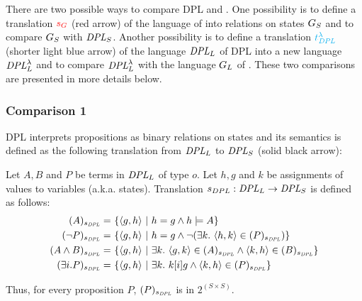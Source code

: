 There are two possible ways to compare DPL and {\GN}. One possibility is to define a translation $\textcolor{red}{s_{G}}$ (red arrow) of the language of {\GN} into relations on states $G_S$ and to compare  $G_S$ with $\textit{DPL}_{S}$. Another possibility is to define a translation $\textcolor{cyan}{t^{\lambda}_\textit{DPL}}$ (shorter light blue arrow) of the language $\textit{DPL}_L$ of DPL into a new language $\textit{DPL}^\lambda_L$ and to compare $\textit{DPL}^\lambda_L$ with the language  $G_L$ of {\GN}. These two comparisons are presented in more details below.


\subsubsection{Comparison 1}

DPL interprets propositions as binary relations on states and its semantics is defined as the following translation from $\textit{DPL}_L$ to $\textit{DPL}_{S}$ (solid black arrow):
\begin{definition} Let $A, B$ and $P$ be terms in $\textit{DPL}_L$ of type $o$. Let $h, g$ and $k$ be assignments of values to variables (a.k.a. states). Translation $s_{DPL}:  \textit{DPL}_L \rightarrow \textit{DPL}_{S}$ is defined as follows:
\begin{align*}
( A )_{s_\textit{DPL}} = \ & \{ \langle g , h \rangle \ | \ h = g \land h  \models A \} \\
( \neg P )_{s_\textit{DPL}} = \ & \{ \langle g , h \rangle \ | \ h = g \land \neg ( \exists k.  \ \langle h, k \rangle \in  ( P )_{s_\textit{DPL}} ) \} \\
( A \land B )_{s_\textit{DPL}} = \ & \{ \langle g , h \rangle \ |  \ \exists k. \ \langle g, k \rangle \in  ( A )_{s_\textit{DPL}}  \land   \langle k, h \rangle \in  ( B )_{s_\textit{DPL}}  \} \\
( \exists i. P )_{s_\textit{DPL}} = \ & \{ \langle g , h \rangle \ |  \ \exists k.  \  k [i] g \land  \langle k, h \rangle \in  ( P )_{s_\textit{DPL}} \} 
\end{align*}
\end{definition}
\noindent Thus, for every proposition $P$, $( P )_{s_\textit{DPL}}$ is in $2^{(S \times S)}$.
%


